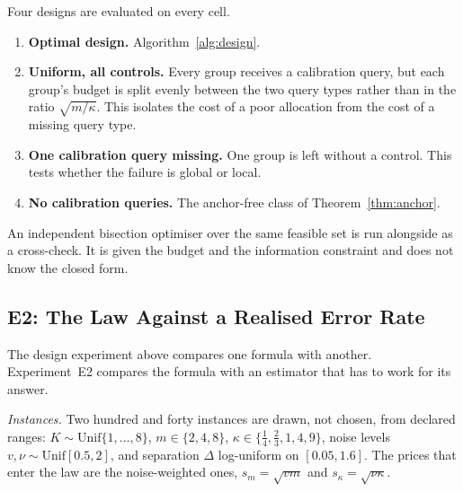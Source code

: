 Four designs are evaluated on every cell.

\begin{enumerate}
\item[1)] \textbf{Optimal design.} Algorithm~\ref{alg:design}.
\item[2)] \textbf{Uniform, all controls.} Every group receives a calibration query, but each
group's budget is split evenly between the two query types rather than in the ratio
$\sqrt{m/\kappa}$. This isolates the cost of a poor allocation from the cost of a missing
query type.
\item[3)] \textbf{One calibration query missing.} One group is left without a control. This
tests whether the failure is global or local.
\item[4)] \textbf{No calibration queries.} The anchor-free class of Theorem~\ref{thm:anchor}.
\end{enumerate}

An independent bisection optimiser over the same feasible set is run alongside as a
cross-check. It is given the budget and the information constraint and does not know the
closed form.

\subsection{E2: The Law Against a Realised Error Rate}
\label{sec:e2}

The design experiment above compares one formula with another. Experiment~E2 compares the
formula with an estimator that has to work for its answer.

\emph{Instances.} Two hundred and forty instances are drawn, not chosen, from declared
ranges: $K\sim\mathrm{Unif}\{1,\dots,8\}$, $m\in\{2,4,8\}$,
$\kappa\in\{\tfrac14,\tfrac23,1,4,9\}$, noise levels $v,\nu\sim\mathrm{Unif}[0.5,2]$,
and separation $\Delta$ log-uniform on $[0.05,1.6]$. The prices that enter the law are the
noise-weighted ones, $s_{m}=\sqrt{vm}$ and $s_{\kappa}=\sqrt{\nu\kappa}$.

